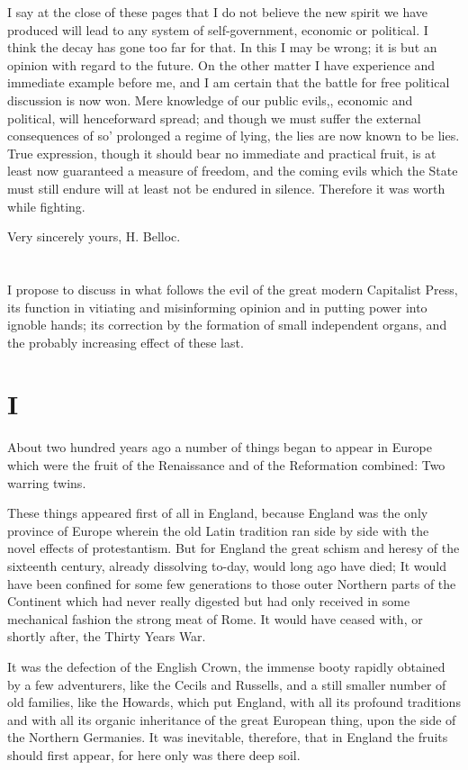 \documentclass{book}
\begin{document}
I say at the close of these pages that I do not believe the new spirit we have produced will lead to any system of self-government, economic or political. I think the decay has gone too far for that. In this I may be wrong; it is but an opinion with regard to the future. On the other matter I have experience and immediate example before me, and I am certain that the battle for free political discussion is now won. Mere knowledge of our public evils,, economic and political, will henceforward spread; and though we must suffer the external consequences of so’ prolonged a regime of lying, the lies are now known to be lies. True expression, though it should bear no immediate and practical fruit, is at least now guaranteed a measure of freedom, and the coming evils which the State must still endure will at least not be endured in silence. Therefore it was worth while fighting.

Very sincerely yours, H. Belloc.

\chapter*{}\label{chapter-1}
I propose to discuss in what follows the evil of the great modern Capitalist Press, its function in vitiating and misinforming opinion and in putting power into ignoble hands; its correction by the formation of small independent organs, and the probably increasing effect of these last.

\chapter*{I}
\label{chapter-2}
About two hundred years ago a number of things began to appear in Europe which were the fruit of the Renaissance and of the Reformation combined: Two warring twins.

These things appeared first of all in England, because England was the only province of Europe wherein the old Latin tradition ran side by side with the novel effects of protestantism. But for England the great schism and heresy of the sixteenth century, already dissolving to-day, would long ago have died; It would have been confined for some few generations to those outer Northern parts of the Continent which had never really digested but had only received in some mechanical fashion the strong meat of Rome. It would have ceased with, or shortly after, the Thirty Years War.

It was the defection of the English Crown, the immense booty rapidly obtained by a few adventurers, like the Cecils and Russells, and a still smaller number of old families, like the Howards, which put England, with all its profound traditions and with all its organic inheritance of the great European thing, upon the side of the Northern Germanies. It was inevitable, therefore, that in England the fruits should first appear, for here only was there deep soil.
\end{document}
